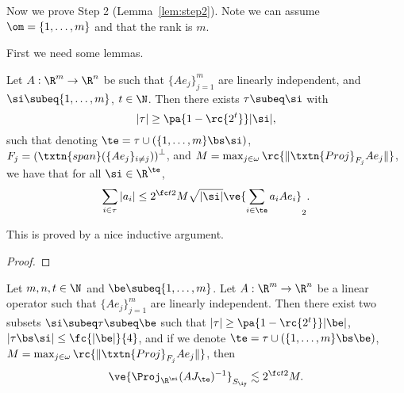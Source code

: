 
Now we prove Step 2 (Lemma~\ref{lem:step2}). Note we can assume $\om=\{1,\ldots, m\}$ and that the rank is $m$.

First we need some lemmas.
\begin{lem}\label{lem:SS-induct}
Let $A:\R^m\to \R^n$ be such that $\{Ae_j\}_{j=1}^m$ are linearly independent, and $\si\subeq \{1,\ldots, m\}$, $t\in \N$. Then there exists $\tau\subeq \si$ with 
\[
|\tau|\ge \pa{1-\rc{2^t}}|\si|,
\]
such that denoting $\te = \tau\cup (\{1,\ldots, m\}\bs \si)$, $F_j = \left(\txtn{span}(\{Ae_j\}_{i \neq j})\right)^{\perp}$, and $M=\max_{j \in \omega} \rc{{\|\txtn{Proj}_{F_j} Ae_j\|}}$, we have that for all $\si\in \R^{\te}$,
\[
\sum_{i\in \tau}|a_i|\le 2^{\fc t2} M \sqrt{|\si|} \ve{\sum_{i\in \te} a_iAe_i}_2.
\]
\end{lem}


This is proved by a nice inductive argument.
\begin{proof}

\end{proof}
\begin{lem}
Let $m,n,t\in \N$ and $\be\subeq \{1,\ldots, m\}$. Let $A:\R^m\to \R^n$ be a linear operator such that $\{Ae_j\}_{j=1}^m$ are linearly independent. Then there exist two subsets
$
\si \subeq \tau \subeq \be
$
such that
$|\tau|\ge \pa{1-\rc{2^t}}|\be|$,  
$|\tau\bs \si| \le \fc{|\be|}{4}$,
and if we denote $\te=\tau\cup (\{1,\ldots, m\}\bs \be)$, $M=\max_{j \in \omega} \rc{{\|\txtn{Proj}_{F_j} Ae_j\|}}$, then 
\[
\ve{\Proj_{\R^{\si}}(AJ_{\te})^{-1}}_{S_{\iy}}\lesssim 2^{\fc t2}M.
\]
\end{lem}


